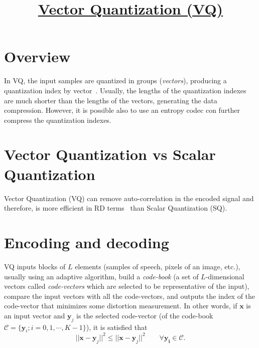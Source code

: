 
\title{\href{https://github.com/vicente-gonzalez-ruiz/vector_quantization}{Vector Quantization (VQ)}}

\maketitle
\tableofcontents

\section{Overview}

In VQ, the input samples are quantized in groups (\emph{vectors}),
producing a quantization index by
vector~\cite{sayood2017introduction}.  Usually, the lengths of the
quantization indexes are much shorter than the lengths of the vectors,
generating the data compression. However, it is possible also to use
an entropy codec con further compress the quantization indexes.


\section{Vector Quantization vs Scalar Quantization}

Vector Quantization (VQ) can remove auto-correlation in the encoded
signal and therefore, is more efficient in RD
terms~\cite{vruiz__information_theory} than Scalar Quantization (SQ).



\section{Encoding and decoding}

VQ inputs blocks of $L$ elements (samples of speech, pixels of an
image, etc.), usually using an adaptive algorithm, build a
\emph{code-book} (a set of $L$-dimensional vectors called
\emph{code-vectors} which are selected to be representative of the
input), compare the input vectors with all the code-vectors, and
outputs the index of the code-vector that minimizes some distortion
measurement. In other words, if $\mathbf{x}$ is an input vector and
$\mathbf{y}_j$ is the selected code-vector (of the code-book
$\mathcal{C}=\{\mathbf{y}_i;i=0,1,\cdots,K-1\}$), it is satisfied that
\begin{equation}
  ||\mathbf{x}-\mathbf{y}_j||^2 \le || \mathbf{x}-\mathbf{y}_j||^2\qquad\forall\mathbf{y_i}\in\mathcal{C}.
\end{equation}

